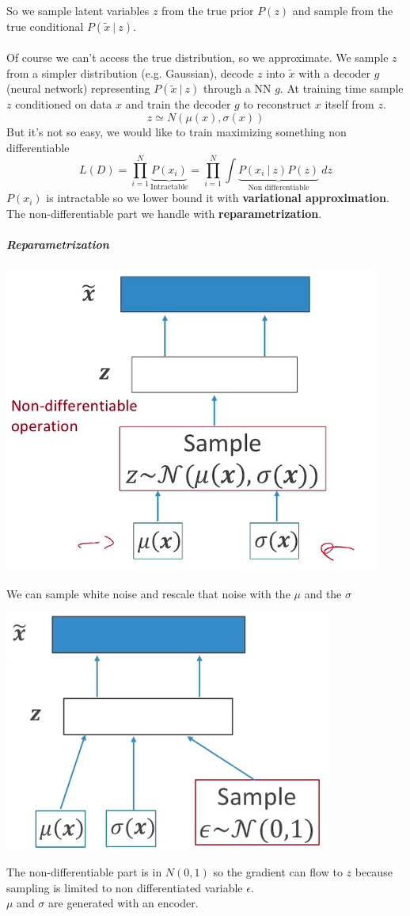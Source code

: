 \documentclass[10pt]{report}
\begin{document}
So we sample latent variables $z$ from the true prior $P(z)$ and sample from the true conditional $P(\tilde{x}\:|\:z)$.\\\\
Of course we can't access the true distribution, so we approximate. We sample $z$ from a simpler distribution (e.g. Gaussian), decode $z$ into $\tilde{x}$ with a decoder $g$ (neural network) representing $P(\tilde{x}\:|\:z)$ through a NN $g$. At training time sample $z$ conditioned on data $x$ and train the decoder $g$ to reconstruct $x$ itself from $z$.
$$z\simeq N(\mu(x),\sigma(x))$$
But it's not so easy, we would like to train maximizing something non differentiable
$$L(D)=\prod_{i=1}^N\underset{\text{Intractable}}{\underbrace{P(x_i)}}=\prod_{i=1}^N\int \underset{\text{Non differentiable}}{\underbrace{P(x_i\:|\:z)P(z)}}\:dz$$
$P(x_i)$ is intractable so we lower bound it with \textbf{variational approximation}.\\
The non-differentiable part we handle with \textbf{reparametrization}.
\subparagraph{Reparametrization} \begin{center}
	\includegraphics[scale=0.5]{142.png}
\end{center}
We can sample white noise and rescale that noise with the $\mu$ and the $\sigma$
\begin{center}
	\includegraphics[scale=0.5]{143.png}
\end{center}
The non-differentiable part is in $N(0,1)$ so the gradient can flow to $z$ because sampling is limited to non differentiated variable $\epsilon$.\\
$\mu$ and $\sigma$ are generated with an encoder.
\end{document}
